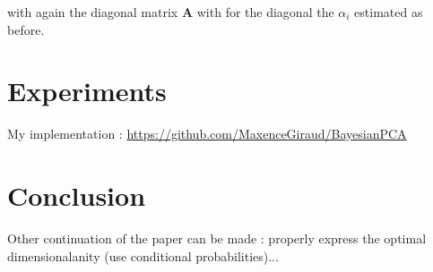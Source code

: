 \documentclass{article}
\begin{document}
with again the diagonal matrix $\mathbf{A}$ with for the diagonal the $\alpha_i$ estimated as before.

\section{Experiments}
My implementation : \url{https://github.com/MaxenceGiraud/BayesianPCA} 

\section{Conclusion}

Other continuation of the paper can be made : properly express the optimal dimensionalanity (use conditional probabilities)...


\end{document}
